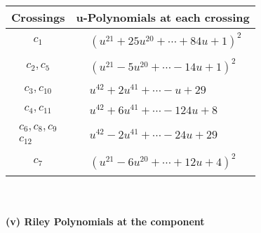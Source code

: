 \documentclass[1p]{elsarticle_modified}
\theoremstyle{definition}
\begin{document}
\begin{tabular}{m{50pt}|m{274pt}}
Crossings & \hspace{64pt}u-Polynomials at each crossing \\
\hline $$\begin{aligned}c_{1}\end{aligned}$$&$\begin{aligned}
&(u^{21}+25 u^{20}+\cdots+84 u+1)^{2}
\end{aligned}$\\
\hline $$\begin{aligned}c_{2},c_{5}\end{aligned}$$&$\begin{aligned}
&(u^{21}-5 u^{20}+\cdots-14 u+1)^{2}
\end{aligned}$\\
\hline $$\begin{aligned}c_{3},c_{10}\end{aligned}$$&$\begin{aligned}
&u^{42}+2 u^{41}+\cdots- u+29
\end{aligned}$\\
\hline $$\begin{aligned}c_{4},c_{11}\end{aligned}$$&$\begin{aligned}
&u^{42}+6 u^{41}+\cdots-124 u+8
\end{aligned}$\\
\hline $$\begin{aligned}c_{6},c_{8},c_{9}\\c_{12}\end{aligned}$$&$\begin{aligned}
&u^{42}-2 u^{41}+\cdots-24 u+29
\end{aligned}$\\
\hline $$\begin{aligned}c_{7}\end{aligned}$$&$\begin{aligned}
&(u^{21}-6 u^{20}+\cdots+12 u+4)^{2}
\end{aligned}$\\
\hline
\end{tabular}\\~\\
\newpage\renewcommand{\arraystretch}{1}
\flushleft \textbf{(v) Riley Polynomials at the component}\newline \\
\end{document}
